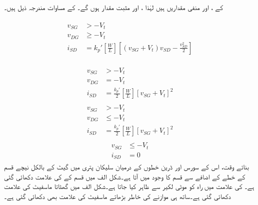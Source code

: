  کے ،  اور  منفی مقداریں ہیں لہٰذا ،  اور  مثبت مقدار ہوں گے۔ کے مساوات مندرجہ ذیل ہیں۔

\begin{gather}
\begin{aligned} \label{مساوات_ماسفیٹ_جمع_غیر_افزائندہ_حدود_و_مساوات}
v_{SG}& >  -V_t \\
v_{DG}& \ge -V_t\\
i_{SD}&=k_p' \left[\frac{W}{L} \right ] \left[\left(v_{SG}+V_t \right )v_{SD}-\frac{v_{SD}^{2}}{2} \right ]
\end{aligned}
\end{gather}

\begin{gather}
\begin{aligned}
v_{SG}& > -V_t\\
v_{DG}&=-V_t\\
i_{SD}&=\frac{k_p'}{2} \left[\frac{W}{L} \right ] \left[v_{SG}+V_t \right]^{2} 
\end{aligned}
\end{gather}
\begin{gather}
\begin{aligned}\label{مساوات_ماسفیٹ_منفی_ماسفیٹ_افزائنہ_صورت_مثبت_متغیرات}
v_{SG}& > -V_t\\
v_{DG}& \le -V_t \\
i_{SD}&=\frac{k_p'}{2} \left[\frac{W}{L} \right ] \left[v_{SG}+V_t \right]^{2}
\end{aligned}
\end{gather}
\begin{gather}
\begin{aligned}
v_{SG}&\le  -V_t\\
i_{SD}&=0
\end{aligned}
\end{gather}
 بناتے وقت، اس کے سورس اور ڈرین خطوں کے درمیان سلیکان پتری میں گیٹ کے بالکل نیچے  قسم کے خطے کے اضافے سے   قسم کا   وجود میں آتا ہے۔شکل  الف میں  قسم کے  کی علامت دکھائی گئی ہے۔ کی علامت میں راہ کو موٹی لکیر سے ظاہر کیا جاتا ہے۔شکل  الف میں  گھٹاتا ماسفیٹ کی علامت دکھائی گئی ہے۔ساتھ ہی موازنے کی خاطر  بڑھاتے ماسفیٹ کی علامت بھی دکھائی گئی ہے۔ 


